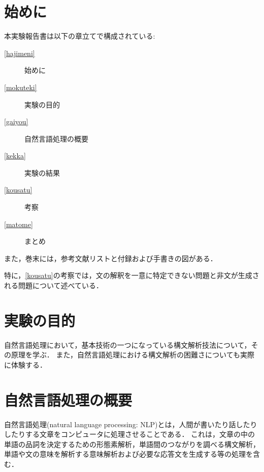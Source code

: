 \documentclass[uplatex, dvipdfmx, a4paper, twocolumn]{jsarticle}
\begin{document}
  \thispagestyle{empty}
  \saythanks

  \section{始めに}\label{hajimeni}
  本実験報告書は以下の章立てで構成されている:
  \begin{description}
    \item[\autoref{hajimeni}] 始めに
    \item[\autoref{mokuteki}] 実験の目的
    \item[\autoref{gaiyou}] 自然言語処理の概要
    \item[\autoref{kekka}] 実験の結果
    \item[\autoref{kousatu}] 考察
    \item[\autoref{matome}] まとめ
  \end{description}
  また，巻末には，参考文献リストと付録および手書きの図がある．

  特に，\autoref{kousatu}の考察では，文の解釈を一意に特定できない問題と非文が生成される問題について述べている．

  \section{実験の目的}\label{mokuteki}
  自然言語処理において，基本技術の一つになっている構文解析技法について，その原理を学ぶ\cite{jikken3c1}．
  また，自然言語処理における構文解析の困難さについても実際に体験する．

  \section{自然言語処理の概要}\label{gaiyou}
  自然言語処理(natural language processing: NLP)とは，人間が書いたり話したりしたりする文章をコンピュータに処理させることである\cite{jikken3c1}．
  これは，文章の中の単語の品詞を決定するための形態素解析，単語間のつながりを調べる構文解析，単語や文の意味を解析する意味解析および必要な応答文を生成する等の処理を含む\cite{jikken3c1}．
\end{document}

